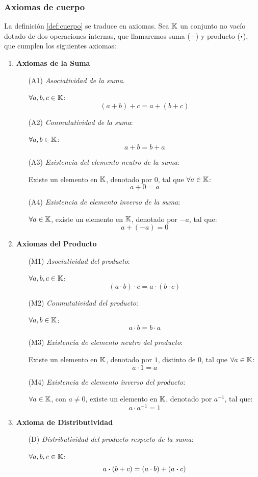 \subsubsection{Axiomas de cuerpo}

La definición \ref{def:cuerpo} se traduce en axiomas. Sea $\mathbb{K}$ un conjunto no vacío dotado de dos operaciones internas, que llamaremos suma ($+$) y producto ($\boldsymbol{\cdot}$), que cumplen los siguientes axiomas:

\begin{enumerate}
	\item \textbf{Axiomas de la Suma}
	
	\begin{itemize}
		\item[(A1)] \textit{Asociatividad de la suma}.
		
		$\forall a, b, c \in \mathbb{K}$:
		\[(a+b)+c=a+(b+c) \]
		\item[(A2)] \textit{Conmutatividad de la suma}:
		
		$\forall a, b \in \mathbb{K}$:
		\[ a + b = b + a \]
		\item[(A3)] \textit{Existencia del elemento neutro de la suma}:
		
		Existe un elemento en $\mathbb{K}$, denotado por $0$, tal que $\forall a \in \mathbb{K}$:
		\[ a + 0 = a \]
		\item[(A4)] \textit{Existencia de elemento inverso de la suma}:
		
		$\forall a \in \mathbb{K}$, existe un elemento en $\mathbb{K}$, denotado por $-a$, tal que:
		\[ a + (-a) = 0 \]
	\end{itemize}
	
	\item \textbf{Axiomas del Producto}
	
	\begin{itemize}
		\item[(M1)] \textit{Asociatividad del producto}:
		
		\( \forall a, b, c \in \mathbb{K} \):
		\[ (a \cdot b) \cdot c = a \cdot (b \cdot c) \]
		\item[(M2)] \textit{Conmutatividad del producto}:
		
		\( \forall a, b \in \mathbb{K} \):
		\[a \cdot b = b \cdot a\]
		\item[(M3)] \textit{Existencia de elemento neutro del producto}:
		
		Existe un elemento en $\mathbb{K}$, denotado por $1$, distinto de $0$, tal que $\forall a \in \mathbb{K}$: \[a \cdot 1 = a\]
		\item[(M4)] \textit{Existencia de elemento inverso del producto}:
		
		$\forall a \in \mathbb{K}$,  con $a \ne 0$, existe un elemento en $\mathbb{K}$, denotado por $a^{-1}$, tal que:
		\[a \cdot a^{-1} = 1\]
	\end{itemize}
	
	\item \textbf{Axioma de Distributividad}
	\begin{itemize}
		\item[(D)] \textit{Distributividad del producto respecto de la suma}:
		
		$\forall a, b, c \in \mathbb{K}$:
		\[a \boldsymbol{\cdot} (b+c) = (a \cdot b) + (a \boldsymbol{\cdot} c)\]
	\end{itemize}
\end{enumerate}
